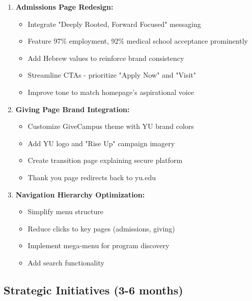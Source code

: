 \documentclass[12pt,letterpaper]{article}
\begin{document}
\begin{enumerate}[leftmargin=*]
    \item \textbf{Admissions Page Redesign:}
    \begin{itemize}
        \item Integrate "Deeply Rooted, Forward Focused" messaging
        \item Feature 97\% employment, 92\% medical school acceptance prominently
        \item Add Hebrew values to reinforce brand consistency
        \item Streamline CTAs - prioritize "Apply Now" and "Visit"
        \item Improve tone to match homepage's aspirational voice
    \end{itemize}

    \item \textbf{Giving Page Brand Integration:}
    \begin{itemize}
        \item Customize GiveCampus theme with YU brand colors
        \item Add YU logo and "Rise Up" campaign imagery
        \item Create transition page explaining secure platform
        \item Thank you page redirects back to yu.edu
    \end{itemize}

    \item \textbf{Navigation Hierarchy Optimization:}
    \begin{itemize}
        \item Simplify menu structure
        \item Reduce clicks to key pages (admissions, giving)
        \item Implement mega-menu for program discovery
        \item Add search functionality
    \end{itemize}
\end{enumerate}

\subsection{Strategic Initiatives (3-6 months)}
\end{document}
